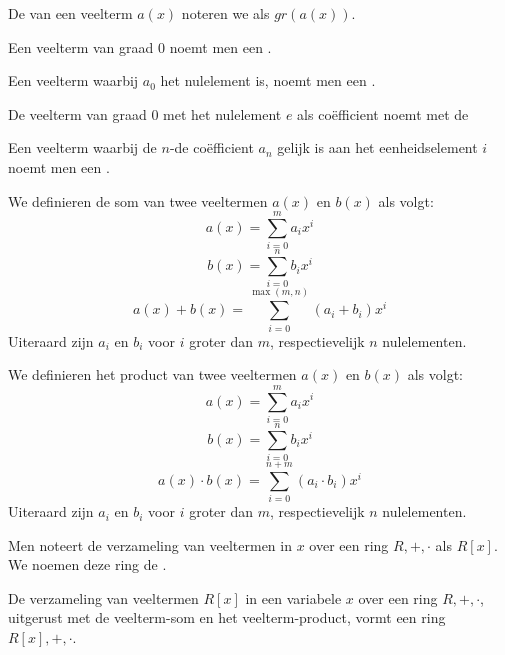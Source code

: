 \documentclass[main.tex]{subfiles}
\begin{document}
\begin{de}
  De  van een veelterm $a(x)$ noteren we als $gr(a(x))$.
\end{de}

\begin{de}
  Een veelterm van graad $0$ noemt men een .
\end{de}

\begin{de}
  Een veelterm waarbij $a_{0}$ het nulelement is, noemt men een .
\end{de}

\begin{de}
  De veelterm van graad $0$ met het nulelement $e$ als co\"efficient noemt met de 
\end{de}

\begin{de}
  Een veelterm waarbij de $n$-de co\"efficient $a_{n}$ gelijk is aan het eenheidselement $i$ noemt men een .
\end{de}

\begin{de}
  We definieren de som van twee veeltermen $a(x)$ en $b(x)$ als volgt:
  \[ a(x) = \sum_{i=0}^{m}a_{i}x^{i} \]
  \[ b(x) = \sum_{i=0}^{n}b_{i}x^{i} \]
  \[  a(x) + b(x) = \sum_{i=0}^{\max(m,n)}(a_{i} + b_{i})x^{i} \]
  Uiteraard zijn $a_{i}$ en $b_{i}$ voor $i$ groter dan $m$, respectievelijk $n$ nulelementen.
\end{de}

\begin{de}
  We definieren het product van twee veeltermen $a(x)$ en $b(x)$ als volgt:
  \[ a(x) = \sum_{i=0}^{m}a_{i}x^{i} \]
  \[ b(x) = \sum_{i=0}^{n}b_{i}x^{i} \]
  \[  a(x)\cdot b(x) = \sum_{i=0}^{n+m}(a_{i} \cdot b_{i})x^{i} \]
  Uiteraard zijn $a_{i}$ en $b_{i}$ voor $i$ groter dan $m$, respectievelijk $n$ nulelementen.
\end{de}

\begin{de}
  Men noteert de verzameling van veeltermen in $x$ over een ring $R,+,\cdot$ als $R[x]$.
  We noemen deze ring de .
\end{de}

\begin{ei}
  De verzameling van veeltermen $R[x]$ in een variabele $x$ over een ring $R,+,\cdot$, uitgerust met de veelterm-som en het veelterm-product, vormt een ring $R[x],+,\cdot$.
\end{ei}
\end{document}
